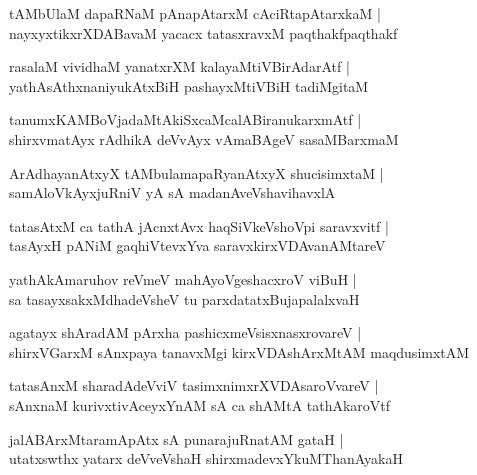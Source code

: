 \documentclass[twoside,12pt,openright]{book}
\newcounter{shloka}[chapter]
\begin{document}
\begin{shloka}%
tAMbUlaM dapaRNaM pAnapAtarxM cAciRtapAtarxkaM |\\
nayxyxtikxrXDABavaM yacacx tatasxravxM paqthakfpaqthakf 
\end{shloka}

\begin{shloka}%
rasalaM vividhaM yanatxrXM kalayaMtiVBirAdarAtf |\\
yathAsAthxnaniyukAtxBiH pashayxMtiVBiH tadiMgitaM 
\end{shloka}

\begin{shloka}%
tanumxKAMBoVjadaMtAkiSxcaMcalABiranukarxmAtf |\\
shirxvmatAyx rAdhikA deVvAyx vAmaBAgeV sasaMBarxmaM 
\end{shloka}

\begin{shloka}%
ArAdhayanAtxyX tAMbulamapaRyanAtxyX shucisimxtaM |\\
samAloVkAyxjuRniV yA sA madanAveVshavihavxlA 
\end{shloka}

\begin{shloka}%
tatasAtxM ca tathA jAcnxtAvx haqSiVkeVshoVpi saravxvitf |\\
tasAyxH pANiM gaqhiVtevxYva saravxkirxVDAvanAMtareV 
\end{shloka}

\begin{shloka}%
yathAkAmaruhov reVmeV mahAyoVgeshacxroV viBuH |\\
sa tasayxsakxMdhadeVsheV tu parxdatatxBujapalalxvaH 
\end{shloka}

\begin{shloka}%
agatayx shAradAM pArxha pashicxmeVsisxnasxrovareV |\\
shirxVGarxM sAnxpaya tanavxMgi kirxVDAshArxMtAM maqdusimxtAM 
\end{shloka}

\begin{shloka}%
tatasAnxM sharadAdeVviV tasimxnimxrXVDAsaroVvareV |\\
sAnxnaM kurivxtivAceyxYnAM sA ca shAMtA tathAkaroVtf
\end{shloka}

\begin{shloka}%
jalABArxMtaramApAtx sA punarajuRnatAM gataH |\\
utatxswthx yatarx deVveVshaH  shirxmadevxYkuMThanAyakaH 
\end{shloka}
\end{document}
